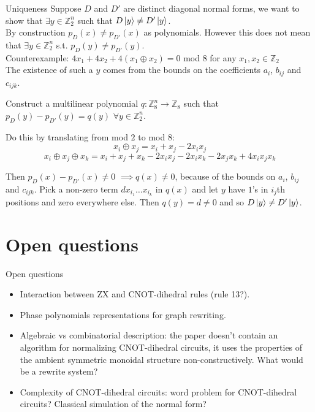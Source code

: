 \documentclass{beamer}
\theoremstyle{definition}
\begin{document}
\begin{frame}{Uniqueness}
Suppose $D$ and $D'$ are distinct diagonal normal forms, we want to show that $\exists y \in \mathbb{Z}_2^n$ such that $D\ket{y} \neq D'\ket{y}$.\\

By construction $p_D(x) \neq p_{D'}(x)$ as polynomials. However this does not mean that $\exists y \in \mathbb{Z}_2^n$ s.t. $p_D(y) \neq p_{D'}(y)$.\\

Counterexample: $4x_1 + 4x_2 + 4(x_1 \oplus x_2) = 0$ mod $8$ for any $x_1, x_2 \in \mathbb{Z}_2$\\

The existence of such a $y$ comes from the bounds on the coefficients $a_i$, $b_{ij}$ and $c_{ijk}$.

Construct a multilinear polynomial $q : \mathbb{Z}_8^n \rightarrow \mathbb{Z}_8$ such that $p_D(y)- p_{D'}(y) = q(y)$ $\forall y \in \mathbb{Z}_2^n$.

Do this by translating from mod $2$ to mod $8$:
$$ x_i \oplus x_j = x_i + x_j -2x_ix_j $$
$$ x_i \oplus x_j \oplus x_k = x_i + x_j + x_k -2x_ix_j -2x_ix_k -2x_jx_k + 4x_ix_jx_k$$

Then $p_D(x) - p_{D'}(x) \neq 0$ $\implies q(x) \neq 0$, because of the bounds on $a_i$, $b_{ij}$ and $c_{ijk}$. Pick a non-zero term $d x_{i_1} \dots x_{i_k}$ in $q(x)$ and let $y$ have $1$'s in $i_j$th positions and zero everywhere else. Then $q(y) = d \neq 0$ and so $D\ket{y} \neq D' \ket{y}$.
\end{frame}

\section{Open questions}
\begin{frame}{Open questions}
	\begin{itemize}
		\item Interaction between ZX and CNOT-dihedral rules (rule 13?).
		\item Phase polynomials representations for graph rewriting.
		\item Algebraic vs combinatorial description: the paper doesn't contain an algorithm for normalizing CNOT-dihedral circuits, it uses the properties of the ambient symmetric monoidal structure non-constructively. What would be a rewrite system?
		\item Complexity of CNOT-dihedral circuits: word problem for CNOT-dihedral circuits? Classical simulation of the normal form?
	\end{itemize}
\end{frame}
\end{document}
